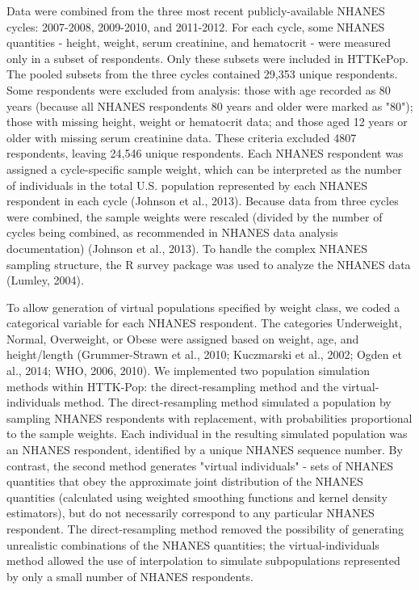 \documentclass[a4paper]{book}
\begin{document}
\begin{Details}
Data were combined from the three most recent publicly-available
NHANES cycles: 2007-2008, 2009-2010, and 2011-2012. For each
cycle, some NHANES quantities - height, weight, serum creatinine,
and hematocrit - were measured only in a subset of respondents. Only
these subsets were included in HTTKePop. The pooled subsets from the
three cycles contained 29,353 unique respondents. Some respondents
were excluded from analysis: those with age recorded as 80 years (because
all NHANES respondents 80 years and older were marked as
"80"); those with missing height, weight or hematocrit data; and those
aged 12 years or older with missing serum creatinine data. These criteria
excluded 4807 respondents, leaving 24,546 unique respondents. Each
NHANES respondent was assigned a cycle-specific sample weight,
which can be interpreted as the number of individuals in the total U.S.
population represented by each NHANES respondent in each cycle
(Johnson et al., 2013). Because data from three cycles were combined,
the sample weights were rescaled (divided by the number of cycles
being combined, as recommended in NHANES data analysis documentation)
(Johnson et al., 2013). To handle the complex NHANES
sampling structure, the R survey package was used to analyze the
NHANES data (Lumley, 2004). 

To allow generation of virtual populations specified by weight class,
we coded a categorical variable for each NHANES respondent. The
categories Underweight, Normal, Overweight, or Obese were assigned
based on weight, age, and height/length (Grummer-Strawn et al., 2010;
Kuczmarski et al., 2002; Ogden et al., 2014; WHO, 2006, 2010). 
We implemented two population simulation methods within HTTK-Pop:
the direct-resampling method and the virtual-individuals method.
The direct-resampling method simulated a population by sampling
NHANES respondents with replacement, with probabilities proportional
to the sample weights. Each individual in the resulting simulated population
was an NHANES respondent, identified by a unique NHANES
sequence number. By contrast, the second method generates "virtual
individuals" - sets of NHANES quantities that obey the approximate
joint distribution of the NHANES quantities (calculated using weighted
smoothing functions and kernel density estimators), but do not necessarily correspond to
any particular NHANES respondent. The direct-resampling method removed
the possibility of generating unrealistic combinations of the
NHANES quantities; the virtual-individuals method allowed the use of
interpolation to simulate subpopulations represented by only a small
number of NHANES respondents. 


\end{Details}
\end{document}
